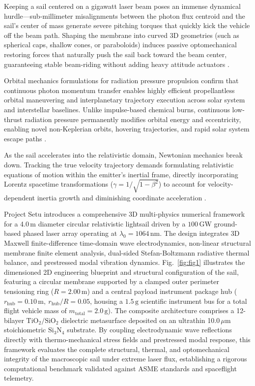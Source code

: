 \documentclass[aps,prd,reprint,superscriptaddress,nofootinbib,floatfix]{revtex4-2}
\begin{document}
Keeping a sail centered on a gigawatt laser beam poses an immense dynamical hurdle---sub-millimeter misalignments between the photon flux centroid and the sail's center of mass generate severe pitching torques that quickly kick the vehicle off the beam path. Shaping the membrane into curved 3D geometries (such as spherical caps, shallow cones, or paraboloids) induces passive optomechanical restoring forces that naturally push the sail back toward the beam center, guaranteeing stable beam-riding without adding heavy attitude actuators \cite{ref5}.

Orbital mechanics formulations for radiation pressure propulsion confirm that continuous photon momentum transfer enables highly efficient propellantless orbital maneuvering and interplanetary trajectory execution across solar system and interstellar baselines. Unlike impulse-based chemical burns, continuous low-thrust radiation pressure permanently modifies orbital energy and eccentricity, enabling novel non-Keplerian orbits, hovering trajectories, and rapid solar system escape paths \cite{ref6}.

As the sail accelerates into the relativistic domain, Newtonian mechanics break down. Tracking the true velocity trajectory demands formulating relativistic equations of motion within the emitter's inertial frame, directly incorporating Lorentz spacetime transformations ($\gamma=1/\sqrt{1-\beta^2}$) to account for velocity-dependent inertia growth and diminishing coordinate acceleration \cite{ref7}.

Project Setu introduces a comprehensive 3D multi-physics numerical framework for a 4.0\,m diameter circular relativistic lightsail driven by a $100\,\mathrm{GW}$ ground-based phased laser array operating at $\lambda_0 = 1064\,\mathrm{nm}$. The design integrates 3D Maxwell finite-difference time-domain wave electrodynamics, non-linear structural membrane finite element analysis, dual-sided Stefan-Boltzmann radiative thermal balance, and prestressed modal vibration dynamics. Fig.~\ref{fig:fig1} illustrates the dimensioned 2D engineering blueprint and structural configuration of the sail, featuring a circular membrane supported by a clamped outer perimeter tensioning ring ($R = 2.00\,\mathrm{m}$) and a central payload instrument package hub ($r_{\mathrm{hub}} = 0.10\,\mathrm{m},\ r_{\mathrm{hub}}/R = 0.05$, housing a $1.5\,\mathrm{g}$ scientific instrument bus for a total flight vehicle mass of $m_{\mathrm{total}} = 2.0\,\mathrm{g}$). The composite architecture comprises a 12-bilayer $\mathrm{TiO}_2/\mathrm{SiO}_2$ dielectric metasurface deposited on an ultrathin 10.0\,$\mu\mathrm{m}$ stoichiometric $\mathrm{Si}_3\mathrm{N}_4$ substrate. By coupling electrodynamic wave reflections directly with thermo-mechanical stress fields and prestressed modal response, this framework evaluates the complete structural, thermal, and optomechanical integrity of the macroscopic sail under extreme laser flux, establishing a rigorous computational benchmark validated against ASME standards and spaceflight telemetry.
\end{document}
